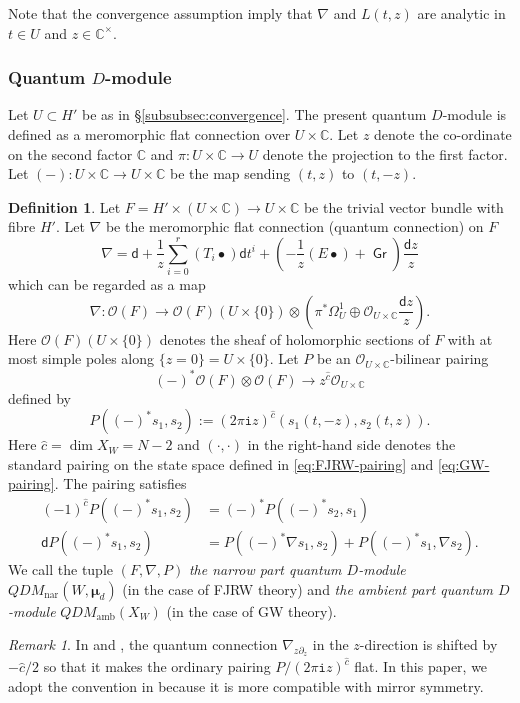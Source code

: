 \documentclass[11pt]{amsart}
\theoremstyle{definition} %
\newtheorem{defn}[thm]{Definition} %
\theoremstyle{remark} %
\newtheorem{rem}[thm]{Remark}%
\newcommand{\CC}{\mathbb C}
\newcommand{\nar}{\operatorname{nar}}
\newcommand{\bmu}{\boldsymbol{\mu}}
\newcommand{\cO}{\mathcal{O}}
\newcommand{\dd}{\mathsf{d}}
\newcommand{\hc}{\hat{c}}
\newcommand{\amb}{\operatorname{amb}}
\newcommand{\grading}{\operatorname{\mathsf{Gr}}} %
\newcommand{\iu}{\mathtt{i}}
\begin{document}
Note that the convergence assumption 
imply that $\nabla$ and $L(t,z)$ are analytic 
in $t\in U$ and $z\in \CC^\times$. 

\subsubsection{Quantum $D$-module} 
\label{subsubsec:QDM} 
Let $U\subset H'$ be as in \S \ref{subsubsec:convergence}. 
The present quantum $D$-module is defined as a meromorphic 
flat connection over $U\times \CC$. 
Let $z$ denote the co-ordinate on the second factor $\CC$ 
and $\pi \colon U\times \CC \to U$ denote the 
projection to the first factor. 
Let $(-) \colon U\times \CC \to U\times \CC$ be 
the map sending $(t,z)$ to $(t,-z)$. 

\begin{defn}
\label{defn:QDM}
Let $F = H' \times (U\times \CC) \to U\times \CC$ 
be the trivial vector bundle with fibre $H'$. 
Let $\nabla$ be the meromorphic 
flat connection (quantum connection) on $F$ 
\[
\nabla = \dd + \frac{1}{z} \sum_{i=0}^r (T_i \bullet) \dd t^i 
+\left( - \frac{1}{z}(E \bullet) + \grading
\right) \frac{\dd z}{z} 
\]
which can be regarded as a map 
\[
\nabla \colon \cO(F) \to \cO(F)(U\times \{0\}) 
\otimes \left(
\pi^* \Omega_U^1 \oplus \cO_{U\times \CC} \frac{\dd z}{z} 
\right). 
\]
Here $\cO(F)(U\times \{0\})$ denotes the sheaf of 
holomorphic sections of $F$ with at most simple poles 
along $\{z=0\} = U\times \{0\}$. 
Let $P$ be an $\cO_{U\times \CC}$-bilinear pairing 
\[
(-)^* \cO(F) \otimes \cO(F) \to z^{\hc} \cO_{U\times \CC} 
\]
defined by 
\[
P((-)^*s_1, s_2) 
:= (2\pi\iu z)^{\hc} (s_1(t,-z), s_2(t,z)). 
\]
Here $\hc = \dim X_W = N-2$ and 
$(\cdot, \cdot)$ in the right-hand side 
denotes the standard pairing on the state 
space defined in \eqref{eq:FJRW-pairing} and 
\eqref{eq:GW-pairing}.   
The pairing satisfies 
\begin{align*} 
(-1)^{\hc} P((-)^* s_1, s_2) & =  (-)^* P((-)^* s_2, s_1)  \\
\dd P((-)^*s_1,s_2) & 
= P((-)^* \nabla s_1, s_2) + P((-)^* s_1,\nabla s_2). 
\end{align*} 
We call the tuple $(F,\nabla,P)$ 
\emph{the narrow part quantum $D$-module} 
$QDM_{\nar}(W,\bmu_d)$ 
(in the case of FJRW theory) and 
\emph{the ambient part quantum $D$-module} 
$QDM_{\amb}(X_W)$ 
(in the case of GW theory). 
\end{defn} 

\begin{rem} 
In \cite{Manin} and \cite[Definition 2.2]{Ir}, 
the quantum connection $\nabla_{z\partial_z}$ in the $z$-direction 
is shifted by $-\hc/2$ so that it makes the ordinary 
pairing $P/(2\pi\iu z)^{\hc}$ flat. 
In this paper, we adopt the convention in 
\cite[Definition 3.1]{Iritani:period} 
because it is more compatible with 
mirror symmetry. 
\end{rem} 
\end{document}
